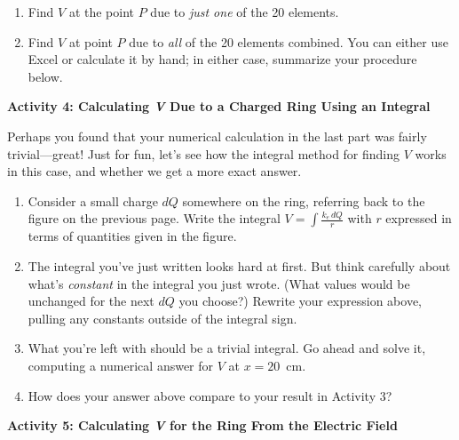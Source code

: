 \begin{enumerate}[labparts]

\item Find $V$ at the point $P$ due to \textit{just one} of the 20 elements.
\answerspace{0.4in}

\item Find $V$ at  point $P$ due to \textit{all} of the 20 elements combined.  You can either use Excel or calculate it by hand; in either case, summarize your procedure below.
\answerspace{0.7in}

\end{enumerate}

\pagebreak[2]
\textbf{Activity 4: Calculating \textit{V} Due to a Charged Ring Using an Integral}

Perhaps you found that your numerical calculation in the last part was fairly trivial---great!  Just for fun, let's see how the integral method for finding $V$ works in this case, and whether we get a more exact answer.

\begin{enumerate}[labparts]

\item Consider a small charge $dQ$ somewhere on the ring, referring back to the figure on the previous page.  Write the integral  
$\displaystyle V=\int{\frac{k_e\,dQ}{r}}$
with $r$ expressed in terms of quantities given in the figure.
\answerspace{0.6in}

\item The integral you've just written looks hard at first.  But think carefully about what's \textit{constant} in the integral you just wrote.  (What values would be unchanged for the next $dQ$ you choose?)  Rewrite your expression above, pulling any constants outside of the integral sign.
\answerspace{0.5in}

\item What you're left with should be a trivial integral.  Go ahead and solve it, computing a numerical answer for $V$ at $x = 20$~cm.
\answerspace{0.7in}


\item How does your answer above compare to your result in Activity 3?
\answerspace{0.3in}
\end{enumerate}

\textbf{Activity 5: Calculating \textit{V} for the Ring From the Electric Field}

\bigskip


